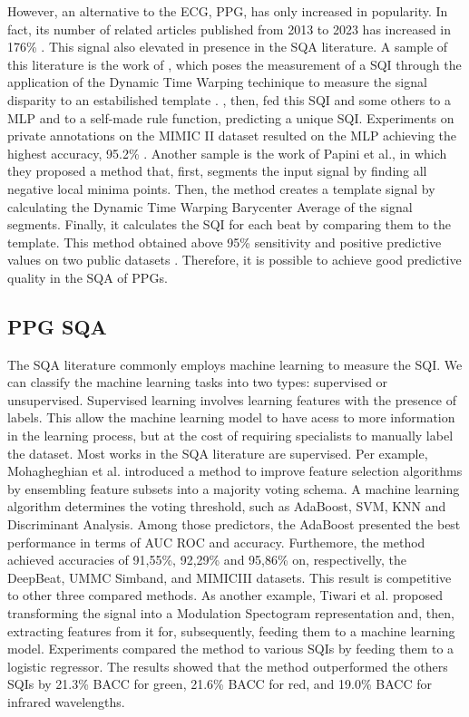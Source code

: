 However, an alternative to the \gls{ECG}, \gls{PPG}, has only increased in popularity. In fact, its number of related articles published from 2013 to 2023 has increased in 176\% \cite{ppg-1}. This signal also elevated in presence in the \gls{SQA} literature. A sample of this literature is the work of \citeauthor{review-1}, which poses the measurement of a \gls{SQI} through the application of the Dynamic Time Warping techinique to measure the signal disparity to an estabilished template \cite{review-1}. \citeauthor{ppg-2}, then, fed this \gls{SQI} and some others to a \gls{MLP} and to a self-made rule function, predicting a unique \gls{SQI}. Experiments on private annotations on the MIMIC II dataset resulted on the \gls{MLP} achieving the highest accuracy, 95.2\% \cite{review-1}. Another sample is the work of Papini et al., in which they proposed a method that, first, segments the input signal by finding all negative local minima points. Then, the method creates a template signal by calculating the Dynamic Time Warping Barycenter Average of the signal segments. Finally, it calculates the \gls{SQI} for each beat by comparing them to the template. This method obtained above 95\% sensitivity and positive predictive values on two public datasets \cite{ppg-3}. Therefore, it is possible to achieve good predictive quality in the \gls{SQA} of \gls{PPG}s.      
	
\subsection{PPG SQA}
		
The \gls{SQA} literature commonly employs machine learning to measure the \gls{SQI}. We can classify the machine learning tasks into two types: supervised or unsupervised. Supervised learning involves learning features with the presence of labels. This allow the machine learning model to have acess to more information in the learning process, but at the cost of requiring specialists to manually label the dataset. Most works in the \gls{SQA} literature are supervised. Per example, Mohagheghian et al. \cite{ppg-sqa-1} introduced a method to improve feature selection algorithms by ensembling feature subsets into a majority voting schema. A machine learning algorithm determines the voting threshold, such as AdaBoost, \gls{SVM}, KNN and Discriminant Analysis. Among those predictors, the AdaBoost presented the best performance in terms of \gls{AUC} \gls{ROC} and accuracy. Furthemore, the method achieved accuracies of 91,55\%, 92,29\% and 95,86\% on, respectivelly, the DeepBeat, UMMC Simband, and MIMICIII datasets. This result is competitive to other three compared methods. As another example, Tiwari et al. \cite{ppg-sqa-2} proposed transforming the signal into a Modulation Spectogram representation and, then, extracting features from it for, subsequently, feeding them to a machine learning model. Experiments compared the method to various \glspl{SQI} by feeding them to a logistic regressor. The results showed that the method outperformed the others \glspl{SQI} by 21.3\% \gls{BACC} for green, 21.6\% \gls{BACC} for red, and 19.0\% \gls{BACC} for infrared wavelengths. 
	
